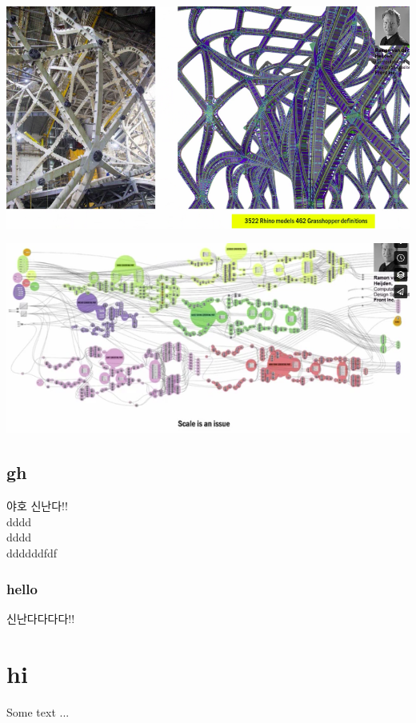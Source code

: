 \documentclass[a4paper]{scrbook}
\begin{document}
\noindent
\begin{minipage}{\textwidth}
    \begin{center}
    \begin{minipage}{0.45\textwidth}
    \includegraphics[width=\linewidth]{morpheus_rhToFab}
    \end{minipage}\hfill
    \begin{minipage}{0.45\textwidth}
    \includegraphics[width=\linewidth]{morpheus_gh} 
    \end{minipage}
    \label{name_label}
    \end{center}
 \end{minipage}
\section{gh}
야호 신난다!! \\
dddd
\\
dddd\\
ddddddfdf\\
\subsection{hello}
신난다다다다!!
\chapter{hi}
Some text ...



\end{document}

